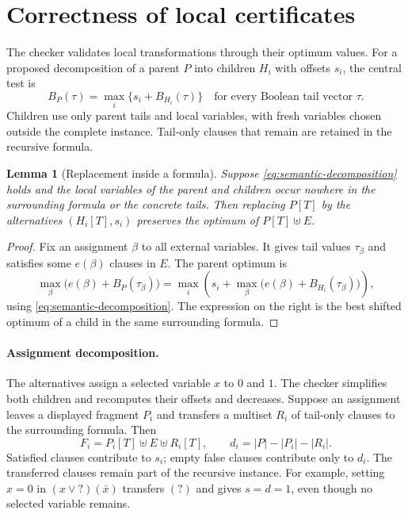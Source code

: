 \documentclass[10pt,twoside]{article}
\newcommand{\anytail}{\mathord{?}}
\newtheorem{lemma}[theorem]{Lemma}
\theoremstyle{definition}
\theoremstyle{remark}
\begin{document}
\section{Correctness of local certificates}
\label{sec:verification}
\label{sec:implementation-checker}

The checker validates local transformations through their optimum values.
For a proposed decomposition of a parent $P$ into children $H_i$ with offsets
$s_i$, the central test is
\begin{equation}
 B_P(\tau)=\max_i\{s_i+B_{H_i}(\tau)\}
 \quad\text{for every Boolean tail vector }\tau.
 \label{eq:semantic-decomposition}
\end{equation}
Children use only parent tails and local variables, with fresh variables
chosen outside the complete instance. Tail-only clauses that remain are
retained in the recursive formula.

\begin{lemma}[Replacement inside a formula]
\label{lem:contextual-replacement}
Suppose \cref{eq:semantic-decomposition} holds and the local variables of the
parent and children occur nowhere in the surrounding formula or the concrete
tails. Then replacing $P[T]$ by the alternatives $(H_i[T],s_i)$ preserves the
optimum of $P[T]\uplus E$.
\end{lemma}
\begin{proof}
Fix an assignment $\beta$ to all external variables. It gives tail values
$\tau_\beta$ and satisfies some $e(\beta)$ clauses in $E$. The parent optimum
is
\[
 \max_\beta\bigl(e(\beta)+B_P(\tau_\beta)\bigr)
 =\max_i\left(s_i+
   \max_\beta\bigl(e(\beta)+B_{H_i}(\tau_\beta)\bigr)\right),
\]
using \cref{eq:semantic-decomposition}. The expression on the right is the
best shifted optimum of a child in the same surrounding formula.
\end{proof}

\paragraph{Assignment decomposition.}
The alternatives assign a selected variable $x$ to $0$ and $1$. The checker
simplifies both children and recomputes their offsets and decreases. Suppose
an assignment leaves a displayed fragment $P_i$ and transfers a multiset $R_i$
of tail-only clauses to the surrounding formula. Then
\begin{equation}
 F_i=P_i[T]\uplus E\uplus R_i[T],\qquad
 d_i=|P|-|P_i|-|R_i|.
 \label{eq:transfer}
\end{equation}
Satisfied clauses contribute to $s_i$; empty false clauses contribute only to
$d_i$. The transferred clauses remain part of the recursive instance.
For example, setting $x=0$ in $(x\vee\anytail)(\bar x)$ transfers $(\anytail)$ and gives
$s=d=1$, even though no selected variable remains.
\end{document}
